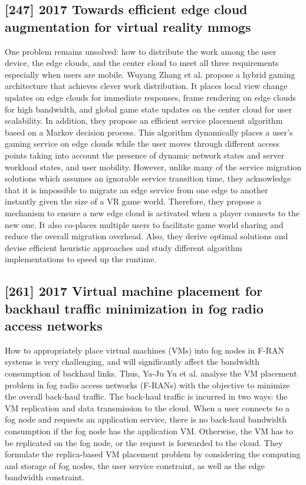 \subsection{[247] 2017 Towards efficient edge cloud augmentation for virtual reality mmogs}
\label{subsec:paper16}
One problem remains unsolved: how to distribute the work among the user device, the edge clouds, and the center cloud to meet all three requirements especially when users are mobile. Wuyang Zhang et al. \cite{zhang2017towards} propose a hybrid gaming architecture that achieves clever work distribution. It places local view change updates on edge clouds for immediate responses, frame rendering on edge clouds for high bandwidth, and global game state updates on the center cloud for user scalability. In addition, they propose an efficient service placement algorithm based on a Markov decision process. This algorithm dynamically places a user’s gaming service on edge clouds while the user moves through different access points taking into account the presence of dynamic network states and server workload states, and user mobility. However, unlike many of the service migration solutions which assumes an ignorable service transition time, they acknowledge that it is impossible to migrate an edge service from one edge to another instantly given the size of a VR game world. Therefore, they propose a mechanism to ensure a new edge cloud is activated when a player connects to the new one. It also co-places multiple users to facilitate game world sharing and reduce the overall migration overhead. Also, they derive optimal solutions and devise efficient heuristic approaches and study different algorithm implementations to speed up the runtime.

\subsection{[261] 2017 Virtual machine placement for backhaul traffic minimization in fog radio access networks}
\label{subsec:paper18}
How to appropriately place virtual machines (VMs) into fog nodes in F-RAN systems is very challenging, and will significantly affect the bandwidth consumption of backhaul links. Thus, Ya-Ju Yu et al. \cite{yu2017virtual} analyse the VM placement problem in fog radio access networks (F-RANs) with the objective to minimize the overall back-haul traffic. The back-haul traffic is incurred in two ways: the VM replication and data transmission to the cloud. When a user connects to a fog node and requests an application service, there is no back-haul bandwidth consumption if the fog node has the application VM. Otherwise, the VM has to be replicated on the fog node, or the request is forwarded to the cloud. They formulate the replica-based VM placement problem by considering the computing and storage of fog nodes, the user service constraint, as well as the edge bandwidth constraint.

